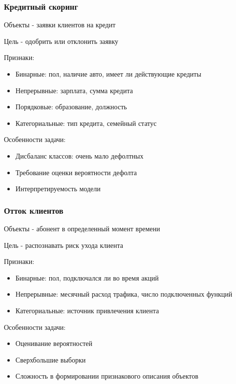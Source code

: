 \documentclass{beamer}
\begin{document}
	
	\begin{frame}
		\frametitle{Кредитный скоринг}
		Объекты - заявки клиентов на кредит
		
		Цель - одобрить или отклонить заявку
		
		\vspace{5pt}
		
		Признаки:
		\begin{itemize}
			\item Бинарные: пол, наличие авто, имеет ли действующие кредиты
			\item Непрерывные: зарплата, сумма кредита
			\item Порядковые: образование, должность
			\item Категориальные: тип кредита, семейный статус
		\end{itemize}
	
		Особенности задачи:
		\begin{itemize}
			\item Дисбаланс классов: очень мало дефолтных
			\item Требование оценки вероятности дефолта
			\item Интерпретируемость модели
		\end{itemize}
	\end{frame}
	
	
	\begin{frame}
		\frametitle{Отток клиентов}
		Объекты - абонент в определенный момент времени
		
		Цель - распознавать риск ухода клиента
		
		\vspace{5pt}
		
		Признаки:
		\begin{itemize}
			\item Бинарные: пол, подключался ли во время акций
			\item Непрерывные: месячный расход трафика, число подключенных функций
			\item Категориальные: источник привлечения клиента
		\end{itemize}
		
		Особенности задачи:
		\begin{itemize}
			\item Оценивание вероятностей
			\item Сверхбольшие выборки
			\item Сложность в формировании признакового описания объектов
		\end{itemize}
	\end{frame}
	
\end{document}
